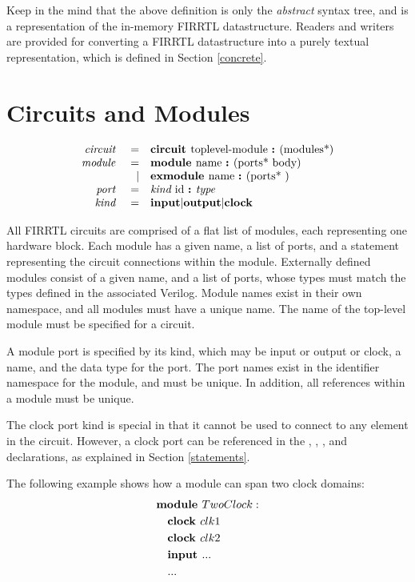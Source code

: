 \documentclass[12pt]{article}
\begin{document}
Keep in the mind that the above definition is only the {\em abstract} syntax tree, and is a representation of the in-memory FIRRTL datastructure.
Readers and writers are provided for converting a FIRRTL datastructure into a purely textual representation, which is defined in Section \ref{concrete}.


\section{Circuits and Modules}
\[
\begin{array}{rrl}
\text{\em circuit\ }    &=     &\text{\bf circuit\ } \text{toplevel-module } \text{\bf :\ } (\text{modules*}) \\
\text{\em module\ }     &=     &\text{\bf module\ }  \text{name } \text{\bf :\ } (\text{ports* } \text{body}) \\
                &\vert &\text{\bf exmodule\ }  \text{name } \text{\bf :\ } (\text{ports* })           \\ 
\text{\em port\ }       &=     &\text{\em kind\ } \text{id } \text{\bf :\ } \text{\em type\ }                                 \\
\text{\em kind\ }       &=     &\text{\bf input} \vert \text{\bf output} \vert \text{\bf clock}              \\
\end{array}
\]

All FIRRTL circuits are comprised of a flat list of modules, each representing one hardware block.
Each module has a given name, a list of ports, and a statement representing the circuit connections within the module.
Externally defined modules consist of a given name, and a list of ports, whose types must match the types defined in the associated Verilog.
Module names exist in their own namespace, and all modules must have a unique name. The name of the top-level module must be specified for a circuit.

A module port is specified by its kind, which may be input or output or clock, a name, and the data type for the port.
The port names exist in the identifier namespace for the module, and must be unique.
In addition, all references within a module must be unique.

The clock port kind is special in that it cannot be used to connect to any element in the circuit.
However, a clock port can be referenced in the , , , and  declarations, as explained in Section \ref{statements}.

The following example shows how a module can span two clock domains:
\[
\begin{aligned}
&\text{\bf module\ } TwoClock : \\
&\quad \text{\bf clock\ } clk1 \\
&\quad \text{\bf clock\ } clk2 \\
&\quad \text{\bf input\ } ... \\
&\quad ... \\
\end{aligned}
\]
\end{document}
